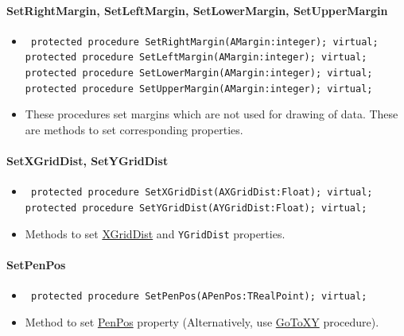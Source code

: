 \documentclass[12pt,a4paper,oneside]{report}
\newcommand{\declarationitem}[1]{{\addfontfeatures{FakeSlant} #1}}
\newcommand{\descriptiontitle}[1]{{\addfontfeatures{FakeSlant}#1}}
\newcommand{\code}[1]{\texttt{#1}}
\begin{document}
\paragraph{SetRightMargin, SetLeftMargin, SetLowerMargin, SetUpperMargin}\hspace*{\fill}
\label{lmcoordsys.TCoordSys-SetRightMargin}
\label{lmcoordsys.TCoordSys-SetLowerMargin}
\label{lmcoordsys.TCoordSys-SetUpperMargin}
\label{lmcoordsys.TCoordSys-SetLeftMargin}
\begin{itemize}\item[\declarationitem{Declaration}\hfill]
	\begin{flushleft}
		\code{
			protected procedure SetRightMargin(AMargin:integer); virtual;\\
			protected procedure SetLeftMargin(AMargin:integer); virtual;\\
			protected procedure SetLowerMargin(AMargin:integer); virtual;\\
			protected procedure SetUpperMargin(AMargin:integer); virtual;}
	\end{flushleft}
	\item[\descriptiontitle{Description}] These procedures set margins which are not used for drawing of data. These are methods to set corresponding properties.
\end{itemize}

\paragraph{SetXGridDist, SetYGridDist}\hspace*{\fill}
\label{lmcoordsys.TCoordSys-SetXGridDist}
\begin{itemize}\item[\declarationitem{Declaration}\hfill]
	\begin{flushleft}
		\code{
			protected procedure SetXGridDist(AXGridDist:Float); virtual;\\
			protected procedure SetYGridDist(AYGridDist:Float); virtual;}
	\end{flushleft}
	\item[\descriptiontitle{Description}] Methods to set \hyperref[lmcoordsys.TCoordSys-XGridDist]{XGridDist} and \code{YGridDist} properties.
\end{itemize}
\paragraph{SetPenPos}\hspace*{\fill}
\label{lmcoordsys.TCoordSys-SetPenPos}
\begin{itemize}\item[\declarationitem{Declaration}\hfill]
	\begin{flushleft}
		\code{
			protected procedure SetPenPos(APenPos:TRealPoint); virtual;}
	\end{flushleft}
	\item[\descriptiontitle{Description}] Method to set \hyperref[lmcoordsys.TCoordSys-PenPos]{PenPos} property (Alternatively, use \hyperref[lmcoordsys.TCoordSys-GoToXY]{GoToXY} procedure).
\end{itemize}
\end{document}
